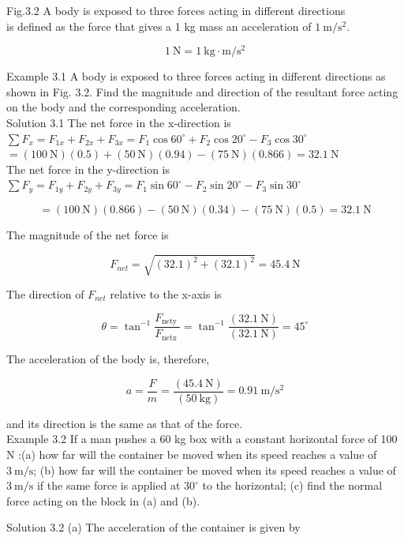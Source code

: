 \documentclass[10pt]{article}
\begin{document}
Fig.3.2 A body is exposed to three forces acting in different directions\\
is defined as the force that gives a 1 kg mass an acceleration of $1 \mathrm{~m} / \mathrm{s}^{2}$.

$$
1 \mathrm{~N}=1 \mathrm{~kg} \cdot \mathrm{m} / \mathrm{s}^{2}
$$

Example 3.1 A body is exposed to three forces acting in different directions as shown in Fig. 3.2. Find the magnitude and direction of the resultant force acting on the body and the corresponding acceleration.\\
Solution 3.1 The net force in the x-direction is\\
$\sum F_{x}=F_{1 x}+F_{2 x}+F_{3 x}=F_{1} \cos 60^{\circ}+F_{2} \cos 20^{\circ}-F_{3} \cos 30^{\circ}$\\
$=(100 \mathrm{~N})(0.5)+(50 \mathrm{~N})(0.94)-(75 \mathrm{~N})(0.866)=32.1 \mathrm{~N}$\\
The net force in the y-direction is\\
$\sum F_{y}=F_{1 y}+F_{2 y}+F_{3 y}=F_{1} \sin 60^{\circ}-F_{2} \sin 20^{\circ}-F_{3} \sin 30^{\circ}$

$$
=(100 \mathrm{~N})(0.866)-(50 \mathrm{~N})(0.34)-(75 \mathrm{~N})(0.5)=32.1 \mathrm{~N}
$$

The magnitude of the net force is

$$
F_{n e t}=\sqrt{(32.1)^{2}+(32.1)^{2}}=45.4 \mathrm{~N}
$$

The direction of $F_{n e t}$ relative to the x-axis is

$$
\theta=\tan ^{-1} \frac{F_{\text {nety }}}{F_{\text {netx }}}=\tan ^{-1} \frac{(32.1 \mathrm{~N})}{(32.1 \mathrm{~N})}=45^{\circ}
$$

The acceleration of the body is, therefore,

$$
a=\frac{F}{m}=\frac{(45.4 \mathrm{~N})}{(50 \mathrm{~kg})}=0.91 \mathrm{~m} / \mathrm{s}^{2}
$$

and its direction is the same as that of the force.\\
Example 3.2 If a man pushes a 60 kg box with a constant horizontal force of 100 N :(a) how far will the container be moved when its speed reaches a value of $3 \mathrm{~m} / \mathrm{s}$; (b) how far will the container be moved when its speed reaches a value of $3 \mathrm{~m} / \mathrm{s}$ if the same force is applied at $30^{\circ}$ to the horizontal; (c) find the normal force acting on the block in (a) and (b).

Solution 3.2 (a) The acceleration of the container is given by
\end{document}

